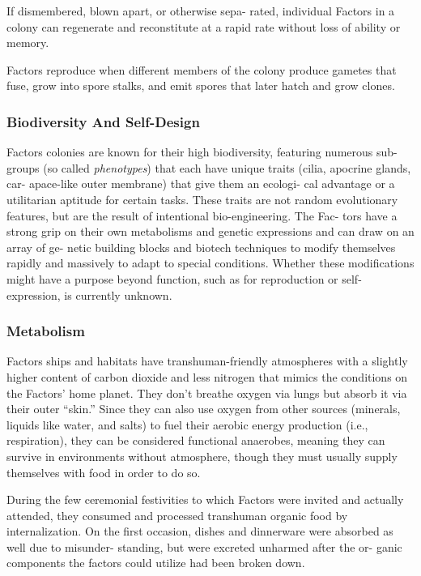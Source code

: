 If dismembered, blown apart, or otherwise sepa-
rated, individual Factors in a colony can regenerate 
and reconstitute at a rapid rate without loss of ability 
or memory. 

Factors reproduce when different members of the 
colony produce gametes that fuse, grow into spore 
stalks, and emit spores that later hatch and grow clones.

\subsubsection{Biodiversity And Self-Design }

Factors colonies are known for their high biodiversity, 
featuring numerous sub-groups (so called \textit{phenotypes}) 
that each have unique traits (cilia, apocrine glands, car-
apace-like outer membrane) that give them an ecologi-
cal advantage or a utilitarian aptitude for certain tasks. 
These traits are not random evolutionary features, but 
are the result of intentional bio-engineering. The Fac-
tors have a strong grip on their own metabolisms and 
genetic expressions and can draw on an array of ge-
netic building blocks and biotech techniques to modify 
themselves rapidly and massively to adapt to special 
conditions. Whether these modifications might have a 
purpose beyond function, such as for reproduction or 
self-expression, is currently unknown. 

\subsubsection{Metabolism }

Factors ships and habitats have transhuman-friendly 
atmospheres with a slightly higher content of carbon 
dioxide and less nitrogen that mimics the conditions 
on the Factors' home planet. They don't breathe 
oxygen via lungs but absorb it via their outer ``skin.'' 
Since they can also use oxygen from other sources 
(minerals, liquids like water, and salts) to fuel their 
aerobic energy production (i.e., respiration), they can 
be considered functional anaerobes, meaning they can 
survive in environments without atmosphere, though 
they must usually supply themselves with food in 
order to do so.

During the few ceremonial festivities to which 
Factors were invited and actually attended, they 
consumed and processed transhuman organic food 
by internalization. On the first occasion, dishes and 
dinnerware were absorbed as well due to misunder-
standing, but were excreted unharmed after the or-
ganic components the factors could utilize had been 
broken down. 


